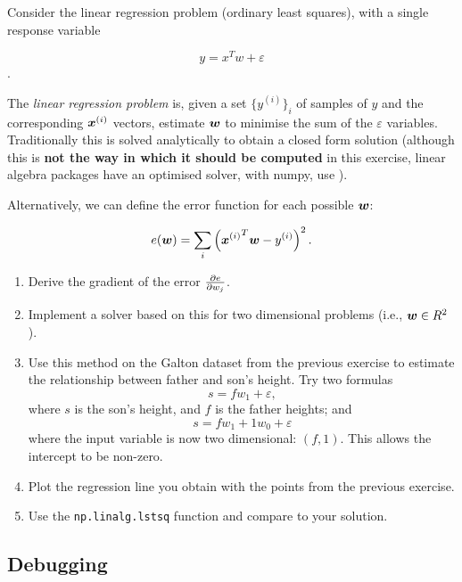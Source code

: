 \begin{exercise}
Consider the linear regression problem (ordinary least squares), with a
single response variable

\[
y = x^T w + \varepsilon
\].

The \emph{linear regression problem} is, given a set $\{ y^{(i)} \}_i$ of
samples of $y$ and the corresponding $\bm{x}^{(i)}$ vectors, estimate
$\bm{w}$ to minimise the sum of the $\varepsilon$ variables. Traditionally
this is solved analytically to obtain a closed form solution (although this is
\textbf{not the way in which it should be computed} in this exercise, linear algebra packages
have an optimised solver, with numpy, use ).

Alternatively, we can define the error function for each possible $\bm{w}$:

\[
e(\bm{w}) = \sum_i \left( {\bm{x}^{(i)}}^T \bm{w} - y^{(i)} \right)^2.
\]

\begin{enumerate}
\item Derive the gradient of the error $\frac{\partial e}{\partial w_j}$.
\item Implement a solver based on this for two dimensional problems (i.e.,
$\bm{w} \in R^2$).
\item Use this method on the Galton dataset from the previous exercise to
estimate the relationship between father and son's height. Try two formulas
\begin{equation}
s = f w_1 + \varepsilon,
\label{}
\end{equation}
where $s$ is the son's height, and $f$ is the father heights; and
\begin{equation}
s = f w_1 + 1w_0 + \varepsilon
\label{}
\end{equation}
where the input variable is now two dimensional: $(f,1)$. This allows the
intercept to be non-zero.
\item Plot the regression line you obtain with the points from the previous
exercise.
\item Use the \texttt{np.linalg.lstsq} function and compare to your solution.
\end{enumerate}
\end{exercise}

\subsection{Debugging}


